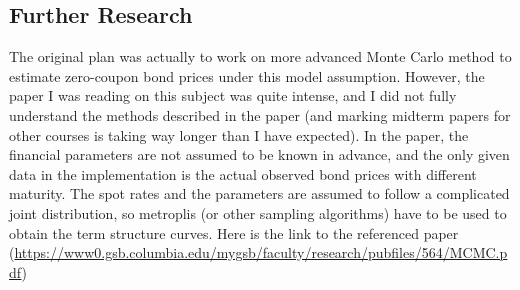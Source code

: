 \subsection{Further Research}
The original plan was actually to work on more advanced Monte Carlo method to estimate zero-coupon bond prices under this model assumption. However, the paper I was reading on this subject was quite intense, and I did not fully understand the methods described in the paper (and marking midterm papers for other courses is taking way longer than I have expected). In the paper, the financial parameters are not assumed to be known in advance, and the only given data in the implementation is the actual observed bond prices with different maturity. The spot rates and the parameters are assumed to follow a complicated joint distribution, so metroplis (or other sampling algorithms) have to be used to obtain the term structure curves. Here is the link to the referenced paper (\url{https://www0.gsb.columbia.edu/mygsb/faculty/research/pubfiles/564/MCMC.pdf})
